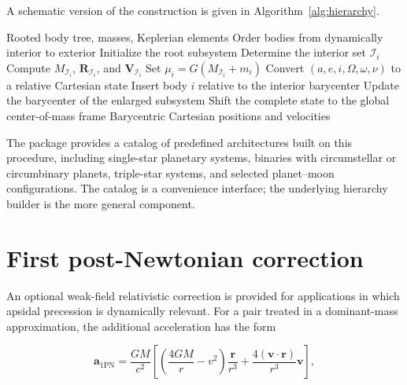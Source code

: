 \documentclass[11pt]{article}
\begin{document}
A schematic version of the construction is given in
Algorithm~\ref{alg:hierarchy}.

\begin{algorithm}
\caption{Hierarchy-aware barycentric initialization}
\label{alg:hierarchy}
\begin{algorithmic}[1]
\Require Rooted body tree, masses, Keplerian elements
\State Order bodies from dynamically interior to exterior
\State Initialize the root subsystem
    \State Determine the interior set $\mathcal I_i$
    \State Compute $M_{\mathcal I_i}$, $\bm R_{\mathcal I_i}$,
           and $\bm V_{\mathcal I_i}$
    \State Set $\mu_i=G(M_{\mathcal I_i}+m_i)$
    \State Convert $(a,e,i,\Omega,\omega,\nu)$ to a relative Cartesian state
    \State Insert body $i$ relative to the interior barycenter
    \State Update the barycenter of the enlarged subsystem
\EndFor
\State Shift the complete state to the global center-of-mass frame
\State \Return Barycentric Cartesian positions and velocities
\end{algorithmic}
\end{algorithm}

The package provides a catalog of predefined architectures built on this
procedure, including single-star planetary systems, binaries with
circumstellar or circumbinary planets, triple-star systems, and selected
planet--moon configurations. The catalog is a convenience interface; the
underlying hierarchy builder is the more general component.


\section{First post-Newtonian correction}
\label{sec:pn}

An optional weak-field relativistic correction is provided for applications
in which apsidal precession is dynamically relevant. For a pair treated in a
dominant-mass approximation, the additional acceleration has the form

\begin{equation}
    \bm a_{\mathrm{1PN}}
    =
    \frac{GM}{c^2}
    \left[
        \left(
            \frac{4GM}{r}-v^2
        \right)
        \frac{\bm r}{r^3}
        +
        \frac{4(\bm v\cdot\bm r)}{r^3}\bm v
    \right],
    \label{eq:pn}
\end{equation}
\end{document}
